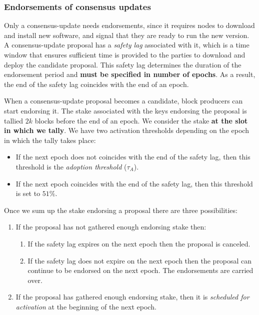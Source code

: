 \subsubsection{Endorsements of consensus updates}
\label{sec:endorsemnts}

Only a consensus-update needs endorsements, since it requires nodes to download
and install new software, and signal that they are ready to run the new version.
A consensus-update proposal has a \emph{safety lag} associated with it, which is
a time window that ensures sufficient time is provided to the parties to
download and deploy the candidate proposal. This safety lag determines the
duration of the endorsement period and \textbf{must be specified in number of
	epochs}. As a result, the end of the safety lag coincides with the end of an
epoch.

When a consensus-update proposal becomes a candidate, block producers can start
endorsing it. The stake associated with the keys endorsing the proposal is
tallied $2k$ blocks before the end of an epoch. We consider the stake
\textbf{at the slot in which we tally}. We have two activation thresholds
depending on the epoch in which the tally takes place:
\begin{itemize}
	\item If the next epoch does not coincides with the end of the safety lag,
	then
	this threshold is the \emph{adoption threshold} ($\tau_A$).
	\item If the next epoch coincides with the end of the safety lag, then this
	threshold is set to $51\%$.
\end{itemize}

Once we sum up the stake endorsing a proposal there are three possibilities:
\begin{enumerate}
	\item If the proposal has not gathered enough endorsing stake then:
	\begin{enumerate}
		\item If the safety lag expires on the next epoch then the proposal is
		canceled.
		\item If the safety lag does not expire on the next epoch then the
		proposal
		can continue to be endorsed on the next epoch. The endorsements are
		carried
		over.
	\end{enumerate}
	\item If the proposal has gathered enough endorsing stake, then it is
	\emph{scheduled for activation} at the beginning of the next epoch.
\end{enumerate}


